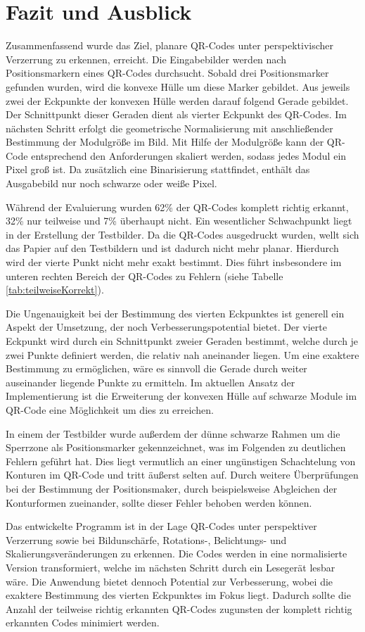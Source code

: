 \documentclass[a4paper, oneside, 12pt]{article}
\begin{document}
\newpage
\section{Fazit und Ausblick}
Zusammenfassend wurde das Ziel, planare QR-Codes unter perspektivischer Verzerrung zu erkennen, erreicht. Die Eingabebilder werden nach Positionsmarkern eines QR-Codes durchsucht. Sobald drei Positionsmarker gefunden wurden, wird die konvexe Hülle um diese Marker gebildet. Aus jeweils zwei der Eckpunkte der konvexen Hülle werden darauf folgend Gerade gebildet. Der Schnittpunkt dieser Geraden dient als vierter Eckpunkt des QR-Codes. Im nächsten Schritt erfolgt die geometrische Normalisierung mit anschließender Bestimmung der Modulgröße im Bild. Mit Hilfe der Modulgröße kann der QR-Code entsprechend den Anforderungen skaliert werden, sodass jedes Modul ein Pixel groß ist. Da zusätzlich eine Binarisierung stattfindet, enthält das Ausgabebild nur noch schwarze oder weiße Pixel. 

Während der Evaluierung wurden 62\% der QR-Codes komplett richtig erkannt, 32\% nur teilweise und 7\% überhaupt nicht. Ein wesentlicher Schwachpunkt liegt in der Erstellung der Testbilder. Da die QR-Codes ausgedruckt wurden, wellt sich das Papier auf den Testbildern und ist dadurch nicht mehr planar. Hierdurch wird der vierte Punkt nicht mehr exakt bestimmt. Dies führt insbesondere im unteren rechten Bereich der QR-Codes zu Fehlern (siehe Tabelle \ref{tab:teilweiseKorrekt}). 

Die Ungenauigkeit bei der Bestimmung des vierten Eckpunktes ist generell ein Aspekt der Umsetzung, der noch Verbesserungspotential bietet. Der vierte Eckpunkt wird durch ein Schnittpunkt zweier Geraden bestimmt, welche durch je zwei Punkte definiert werden, die relativ nah aneinander liegen. Um eine exaktere Bestimmung zu ermöglichen, wäre es sinnvoll die Gerade durch weiter auseinander liegende Punkte zu ermitteln. Im aktuellen Ansatz der Implementierung ist die Erweiterung der konvexen Hülle auf schwarze Module im QR-Code eine Möglichkeit um dies zu erreichen.

In einem der Testbilder wurde außerdem der dünne schwarze Rahmen um die Sperrzone als Positionsmarker gekennzeichnet, was im Folgenden zu deutlichen Fehlern geführt hat. Dies liegt vermutlich an einer ungünstigen Schachtelung von Konturen im QR-Code und tritt äußerst selten auf. Durch weitere Überprüfungen bei der Bestimmung der Positionsmaker, durch beispielsweise Abgleichen der Konturformen zueinander, sollte dieser Fehler behoben werden können.

Das entwickelte Programm ist in der Lage QR-Codes unter perspektiver Verzerrung sowie bei Bildunschärfe, Rotations-, Belichtungs- und Skalierungsveränderungen zu erkennen. Die Codes werden in eine normalisierte Version transformiert, welche im nächsten Schritt durch ein Lesegerät lesbar wäre. Die Anwendung bietet dennoch Potential zur Verbesserung, wobei die exaktere Bestimmung des vierten Eckpunktes im Fokus liegt. Dadurch sollte die Anzahl der teilweise richtig erkannten QR-Codes zugunsten der komplett richtig erkannten Codes minimiert werden.
\end{document}
